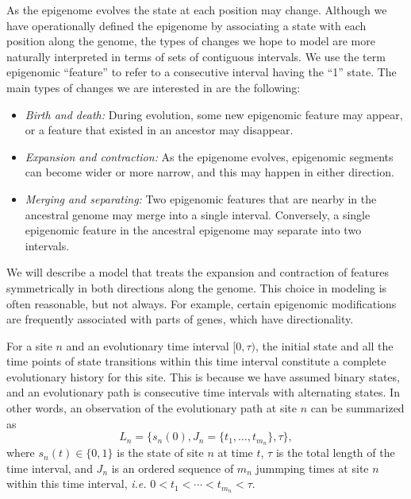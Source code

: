 \documentclass[11pt]{article}
\begin{document}
As the epigenome evolves the state at each position may
change. Although we have operationally defined the epigenome by
associating a state with each position along the genome, the types of
changes we hope to model are more naturally interpreted in terms of
sets of contiguous intervals. We use the term epigenomic ``feature''
to refer to a consecutive interval having the ``1'' state. The
main types of changes we are interested in are the following:
\begin{itemize}
\item {\it Birth and death:} During evolution, some new epigenomic
  feature may appear, or a feature that existed in an ancestor may
  disappear. %
\item {\it Expansion and contraction:} As the epigenome evolves,
  epigenomic segments can become wider or more narrow, and this may
  happen in either direction.
\item {\it Merging and separating:} Two epigenomic features that are
  nearby in the ancestral genome may merge into a single interval.
  Conversely, a single epigenomic feature in the ancestral epigenome
  may separate into two intervals.
\end{itemize}
We will describe a model that treats the expansion and contraction of
features symmetrically in both directions along the genome.  This
choice in modeling is often reasonable, but not always. For example,
certain epigenomic modifications are frequently associated with parts
of genes, which have directionality.

For a site $n$ and an evolutionary time interval $[0,\tau)$, the initial
state and all the time points of state transitions within this time
interval constitute a complete evolutionary history for this
site. This is because we have assumed binary states, and an
evolutionary path is consecutive time intervals with alternating
states. In other words, an observation of the evolutionary path at site $n$
can be summarized as
\[
L_n = \big\{s_n(0), J_n=\{t_1,\ldots,t_{m_n}\}, \tau \big\},
\]
where $s_n(t)\in\{0,1\}$ is the state of site $n$ at time $t$, $\tau$
is the total length of the time interval, and $J_n$ is an ordered
sequence of $m_n$ jummping times at site $n$ within this time
interval, \textit{i.e.} $0 < t_1 < \cdots < t_{m_n} < \tau$.
\end{document}

